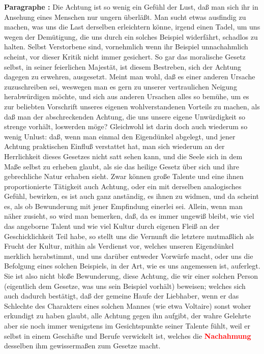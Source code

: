 \documentclass[a4paper,12pt,twoside]{book}
\newcommand{\match}[1]{\textcolor{red}{\textbf{#1}}}
\begin{document}
	\noindent\textbf{Paragraphe : }Die Achtung ist so wenig ein Gefühl der Lust, daß man sich ihr in Ansehung eines Menschen nur ungern überläßt. Man sucht etwas ausfindig zu machen, was uns die Last derselben erleichtern könne, irgend einen Tadel, um uns wegen der Demütigung, die uns durch ein solches Beispiel widerfährt, schadlos zu halten. Selbst Verstorbene sind, vornehmlich wenn ihr Beispiel unnachahmlich scheint, vor dieser Kritik nicht immer gesichert. So gar das moralische Gesetz selbst, in seiner feierlichen Majestät, ist diesem Bestreben, sich der Achtung dagegen zu erwehren, ausgesetzt. Meint man wohl, daß es einer anderen Ursache zuzuschreiben sei, weswegen man es gern zu unserer vertraulichen Neigung herabwürdigen möchte, und sich aus anderen Ursachen alles so bemühe, um es zur beliebten Vorschrift unseres eigenen wohlverstandenen Vorteils zu machen, als daß man der abschreckenden Achtung, die uns unsere eigene Unwürdigkeit so strenge vorhält, loswerden möge? Gleichwohl ist darin doch auch wiederum so wenig Unlust: daß, wenn man einmal den Eigendünkel abgelegt, und jener Achtung praktischen Einfluß verstattet hat, man sich wiederum an der Herrlichkeit dieses Gesetzes nicht satt  sehen kann, und die Seele sich in dem Maße selbst zu erheben glaubt, als sie das heilige Gesetz über sich und ihre gebrechliche Natur erhaben sieht. Zwar können große Talente und eine ihnen proportionierte Tätigkeit auch Achtung, oder ein mit derselben analogisches Gefühl, bewirken, es ist auch ganz anständig, es ihnen zu widmen, und da scheint es, als ob Bewunderung mit jener Empfindung einerlei sei. Allein, wenn man näher zusieht, so wird man bemerken, daß, da es immer ungewiß bleibt, wie viel das angeborne Talent und wie viel Kultur durch eigenen Fleiß an der Geschicklichkeit Teil habe, so stellt uns die Vernunft die letztere mutmaßlich als Frucht der Kultur, mithin als Verdienst vor, welches unseren Eigendünkel merklich herabstimmt, und uns darüber entweder Vorwürfe macht, oder uns die Befolgung eines solchen Beispiels, in der Art, wie es uns angemessen ist, auferlegt. Sie ist also nicht bloße Bewunderung, diese Achtung, die wir einer solchen Person (eigentlich dem Gesetze, was uns sein Beispiel vorhält) beweisen; welches sich auch dadurch bestätigt, daß der gemeine Haufe der Liebhaber, wenn er das Schlechte des Charakters eines solchen Mannes (wie etwa Voltaire) sonst woher erkundigt zu haben glaubt, alle Achtung gegen ihn aufgibt, der wahre Gelehrte aber sie noch immer wenigstens im Gesichtspunkte seiner Talente fühlt, weil er selbst in einem Geschäfte und Berufe verwickelt ist, welches die \match{Nachahmung} desselben ihm gewissermaßen zum Gesetze macht. 
	
\end{document}
